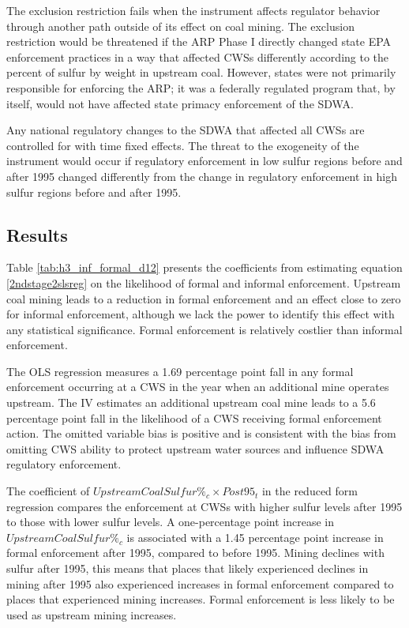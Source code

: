 \documentclass{article}
\begin{document}
The exclusion restriction fails when the instrument affects regulator behavior through another path outside of its effect on coal mining. The exclusion restriction would be threatened if the ARP Phase I directly changed state EPA enforcement practices in a way that affected CWSs differently according to the percent of sulfur by weight in upstream coal. However, states were not primarily responsible for enforcing the ARP; it was a federally regulated program that, by itself, would not have affected state primacy enforcement of the SDWA.

Any national regulatory changes to the SDWA that affected all CWSs are controlled for with time fixed effects. The threat to the exogeneity of the instrument would occur if regulatory enforcement in low sulfur regions before and after 1995 changed differently from the change in regulatory enforcement in high sulfur regions before and after 1995.

\subsection{Results}

Table \ref{tab:h3_inf_formal_d12} presents the coefficients from estimating equation \ref{2ndstage2slsreg} on the likelihood of formal and informal enforcement. Upstream coal mining leads to a reduction in formal enforcement and an effect close to zero for informal enforcement, although we lack the power to identify this effect with any statistical significance. Formal enforcement is relatively costlier than informal enforcement.

The OLS regression measures a 1.69 percentage point fall in any formal enforcement occurring at a CWS in the year when an additional mine operates upstream. The IV estimates an additional upstream coal mine leads to a 5.6 percentage point fall in the likelihood of a CWS receiving formal enforcement action. The omitted variable bias is positive and is consistent with the bias from omitting CWS ability to protect upstream water sources and influence SDWA regulatory enforcement. 

The coefficient of $UpstreamCoalSulfur\%_c \times Post95_t$ in the reduced form regression compares the enforcement at CWSs with higher sulfur levels after 1995 to those with lower sulfur levels. A one-percentage point increase in $UpstreamCoalSulfur\%_c$ is associated with a 1.45 percentage point increase in formal enforcement after 1995, compared to before 1995. Mining declines with sulfur after 1995, this means that places that likely experienced declines in mining after 1995 also experienced increases in formal enforcement compared to places that experienced mining increases. Formal enforcement is less likely to be used as upstream mining increases. 
\end{document}

